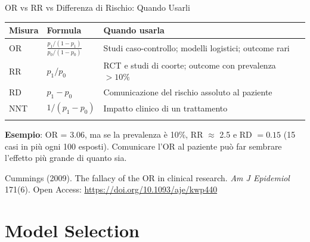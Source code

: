 \documentclass[
  ignorenonframetext,
]{beamer}
\begin{document}
\begin{frame}{OR vs RR vs Differenza di Rischio: Quando Usarli}
\label{or-vs-rr-vs-differenza-di-rischio-quando-usarli}
\small

\begin{longtable}[]{@{}
  >{\raggedright\arraybackslash}p{}
  >{\raggedright\arraybackslash}p{}
  >{\raggedright\arraybackslash}p{}@{}}
\toprule\noalign{}
\begin{minipage}[b]{\linewidth}\raggedright
Misura
\end{minipage} & \begin{minipage}[b]{\linewidth}\raggedright
Formula
\end{minipage} & \begin{minipage}[b]{\linewidth}\raggedright
Quando usarla
\end{minipage} \\
\midrule\noalign{}
\endhead
\footnotesize OR & \footnotesize \(\frac{p_1/(1-p_1)}{p_0/(1-p_0)}\) &
\footnotesize Studi caso-controllo; modelli logistici; outcome rari \\
\footnotesize RR & \footnotesize \(p_1 / p_0\) & \footnotesize RCT e
studi di coorte; outcome con prevalenza \(>10\%\) \\
\footnotesize RD & \footnotesize \(p_1 - p_0\) &
\footnotesize Comunicazione del rischio assoluto al paziente \\
\footnotesize NNT & \footnotesize \(1/(p_1 - p_0)\) &
\footnotesize Impatto clinico di un trattamento \\
\bottomrule\noalign{}
\end{longtable}

\vspace{0.3em}

\small \textbf{Esempio}: OR = 3.06, ma se la prevalenza è 10\%, RR
\(\approx\) 2.5 e RD \(= 0.15\) (15 casi in più ogni 100 esposti).
Comunicare l'OR al paziente può far sembrare l'effetto più grande di
quanto sia.

\vspace{0.2em}

\tiny Cummings (2009). The fallacy of the OR in clinical research.
\emph{Am J Epidemiol} 171(6). Open Access:
\url{https://doi.org/10.1093/aje/kwp440}
\end{frame}

\section{Model Selection}\label{model-selection}
\end{document}
